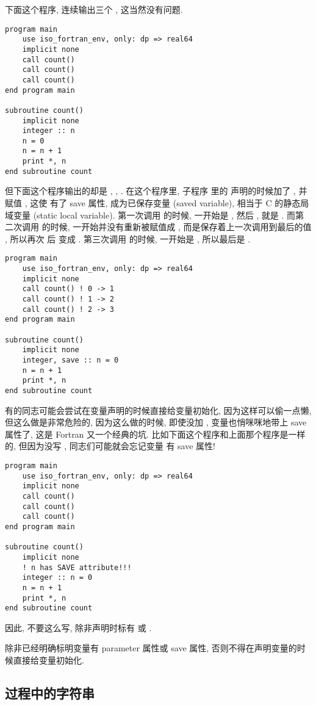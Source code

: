 下面这个程序, 连续输出三个 , 这当然没有问题. 
\begin{lstlisting} 
program main
    use iso_fortran_env, only: dp => real64
    implicit none
    call count()
    call count()
    call count()
end program main

subroutine count()
    implicit none
    integer :: n
    n = 0
    n = n + 1
    print *, n
end subroutine count
\end{lstlisting} 
但下面这个程序输出的却是 , , . 在这个程序里, 子程序  里的  声明的时候加了 , 并赋值 , 这使  有了 save 属性, 成为已保存变量 (saved variable), 相当于 C 的静态局域变量 (static local variable). 第一次调用  的时候,  一开始是 , 然后 ,  就是 . 而第二次调用  的时候,  一开始并没有重新被赋值成 , 而是保存着上一次调用到最后的值 , 所以再次  后  变成 . 第三次调用  的时候,  一开始是 , 所以最后是 . 
\begin{lstlisting} 
program main
    use iso_fortran_env, only: dp => real64
    implicit none
    call count() ! 0 -> 1
    call count() ! 1 -> 2
    call count() ! 2 -> 3
end program main

subroutine count()
    implicit none
    integer, save :: n = 0
    n = n + 1
    print *, n
end subroutine count
\end{lstlisting} 
有的同志可能会尝试在变量声明的时候直接给变量初始化, 因为这样可以偷一点懒, 但这么做是非常危险的, 因为这么做的时候, 即使没加 , 变量也悄咪咪地带上 save 属性了, 这是 Fortran 又一个经典的坑. 比如下面这个程序和上面那个程序是一样的, 但因为没写 , 同志们可能就会忘记变量  有 save 属性!
\begin{lstlisting} 
program main
    use iso_fortran_env, only: dp => real64
    implicit none
    call count()
    call count()
    call count()
end program main

subroutine count()
    implicit none
    ! n has SAVE attribute!!!
    integer :: n = 0 
    n = n + 1
    print *, n
end subroutine count
\end{lstlisting} 
因此, 不要这么写, 除非声明时标有  或 . 
\begin{convention} 
    除非已经明确标明变量有 parameter 属性或 save 属性, 否则不得在声明变量的时候直接给变量初始化. 
\end{convention} 

\subsection{过程中的字符串} 

